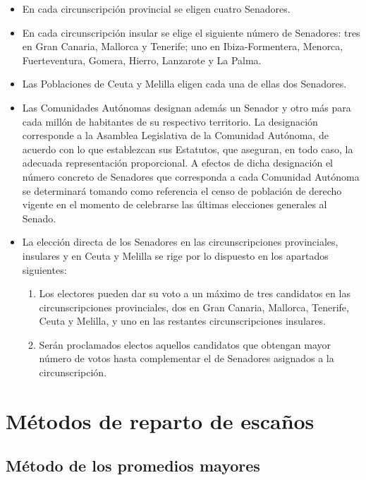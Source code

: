 \documentclass[12pt,a4paper,]{book}
\numberwithin{dummy}{section}
\theoremstyle{ocrenumbox}
\theoremstyle{blacknumex}
\theoremstyle{blacknumbox}
\theoremstyle{ocrenum}
\theoremstyle{ocrenum}
\begin{document}
\begin{itemize}
\item
  En cada circunscripción provincial se eligen cuatro Senadores.
\item
  En cada circunscripción insular se elige el siguiente número de
  Senadores: tres en Gran Canaria, Mallorca y Tenerife; uno en
  Ibiza-Formentera, Menorca, Fuerteventura, Gomera, Hierro, Lanzarote y
  La Palma.
\item
  Las Poblaciones de Ceuta y Melilla eligen cada una de ellas dos
  Senadores.
\item
  Las Comunidades Autónomas designan además un Senador y otro más para
  cada millón de habitantes de su respectivo territorio. La designación
  corresponde a la Asamblea Legislativa de la Comunidad Autónoma, de
  acuerdo con lo que establezcan sus Estatutos, que aseguran, en todo
  caso, la adecuada representación proporcional. A efectos de dicha
  designación el número concreto de Senadores que corresponda a cada
  Comunidad Autónoma se determinará tomando como referencia el censo de
  población de derecho vigente en el momento de celebrarse las últimas
  elecciones generales al Senado.
\item
  La elección directa de los Senadores en las circunscripciones
  provinciales, insulares y en Ceuta y Melilla se rige por lo dispuesto
  en los apartados siguientes:

  \begin{enumerate}
  \def\labelenumi{\alph{enumi})}
  \item
    Los electores pueden dar su voto a un máximo de tres candidatos en
    las circunscripciones provinciales, dos en Gran Canaria, Mallorca,
    Tenerife, Ceuta y Melilla, y uno en las restantes circunscripciones
    insulares.
  \item
    Serán proclamados electos aquellos candidatos que obtengan mayor
    número de votos hasta complementar el de Senadores asignados a la
    circunscripción.
  \end{enumerate}
\end{itemize}

\hypertarget{muxe9todos-de-reparto-de-escauxf1os}{%
\chapter{Métodos de reparto de
escaños}\label{muxe9todos-de-reparto-de-escauxf1os}}

\hypertarget{muxe9todo-de-los-promedios-mayores}{%
\section{Método de los promedios
mayores}\label{muxe9todo-de-los-promedios-mayores}}
\end{document}
